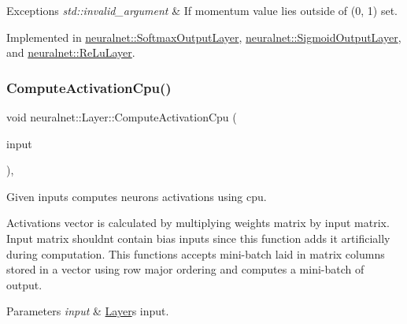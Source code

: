 \begin{DoxyExceptions}{Exceptions}
{\em std\+::invalid\+\_\+argument} & If momentum value lies outside of (0, 1) set. \\
\hline
\end{DoxyExceptions}


Implemented in \hyperlink{classneuralnet_1_1SoftmaxOutputLayer_af3308eebc5a7acc982f4ac0b55d34fc3}{neuralnet\+::\+Softmax\+Output\+Layer}, \hyperlink{classneuralnet_1_1SigmoidOutputLayer_a0e9397124e10c8be7a7f587982e7c948}{neuralnet\+::\+Sigmoid\+Output\+Layer}, and \hyperlink{classneuralnet_1_1ReLuLayer_aafc499ba5e1de303b447ad1abb26f914}{neuralnet\+::\+Re\+Lu\+Layer}.

\mbox{\label{classneuralnet_1_1Layer_a6e8f59ebde8c44d72004ba0d563b01c6}} 
\subsubsection{\texorpdfstring{Compute\+Activation\+Cpu()}{ComputeActivationCpu()}}
{\footnotesize\ttfamily void neuralnet\+::\+Layer\+::\+Compute\+Activation\+Cpu (\begin{DoxyParamCaption}\item[{const std\+::vector$<$ double $>$ \&}]{input }\end{DoxyParamCaption})\hspace{0.3cm}{\ttfamily [protected]}, {\ttfamily [virtual]}}



Given inputs computes neurons\textquotesingle{} activations using cpu. 

Activations vector is calculated by multiplying weights matrix by input matrix. Input matrix shouldn\textquotesingle{}t contain bias inputs since this function adds it artificially during computation. This functions accepts mini-\/batch laid in matrix columns stored in a vector using row major ordering and computes a mini-\/batch of output.


\begin{DoxyParams}{Parameters}
{\em input} & \hyperlink{classneuralnet_1_1Layer}{Layer}\textquotesingle{}s input. \\
\hline
\end{DoxyParams}
\mbox{\label{classneuralnet_1_1Layer_a496fe8418591fde8ea2f151ae0e8f274}} 

